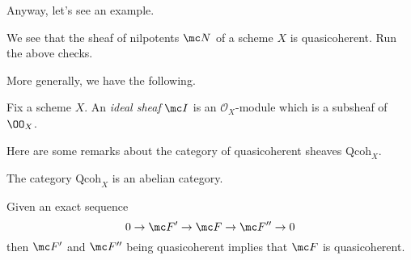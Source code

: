 \documentclass[../notes.tex]{subfiles}
\begin{document}
Anyway, let's see an example.
\begin{ex}
	We see that the sheaf of nilpotents $\mc N$ of a scheme $X$ is quasicoherent. Run the above checks.
\end{ex}
More generally, we have the following.
\begin{definition}
	Fix a scheme $X$. An \textit{ideal sheaf} $\mc I$ is an $\mathcal O_X$-module which is a subsheaf of $\OO_X$.
\end{definition}
\begin{lemma}
	Here are some remarks about the category of quasicoherent sheaves $\mathrm{Qcoh}_X$.
	\begin{listalph}
		\item The category $\mathrm{Qcoh}_X$ is an abelian category.
		\item Given an exact sequence
		\[0\to\mc F'\to\mc F\to\mc F''\to0\]
		then $\mc F'$ and $\mc F''$ being quasicoherent implies that $\mc F$ is quasicoherent.
	\end{listalph}
\end{lemma}
\end{document}
